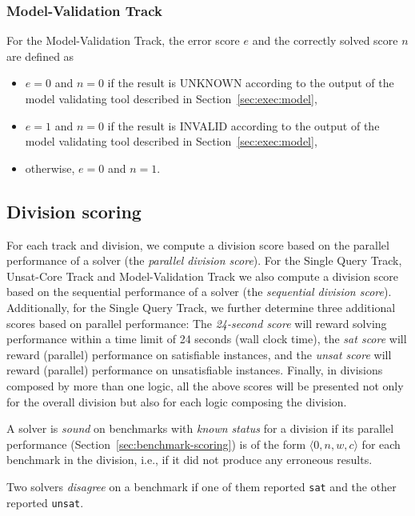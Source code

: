 \documentclass[12pt]{article}
\newcommand{\maintrack}{Single Query Track\xspace}
\newcommand{\ucoretrack}{Unsat-Core Track\xspace}
\newcommand{\mvaltrack}{Model-Validation Track\xspace}
\begin{document}
\subsubsection{\mvaltrack}
  For the \mvaltrack, the error score $e$ and the correctly solved score $n$
  are defined as
  \begin{itemize}
  \item $e=0$ and $n=0$ if the result is UNKNOWN according to the output of
    the model validating tool described in Section~\ref{sec:exec:model},
  \item $e=1$ and $n=0$ if the result is INVALID according to the output of
    the model validating tool described in Section~\ref{sec:exec:model},
  \item otherwise, $e=0$ and $n=1$.
  \end{itemize}

\subsection{Division scoring}
\label{sec:division-scoring}

For each track and division, we compute a division score based on the parallel
performance of a solver (the \emph{parallel division score}).  For the
\maintrack, \ucoretrack and \mvaltrack we also compute a division
score based on the sequential performance of a solver (the \emph{sequential
division score}).  Additionally, for the \maintrack, we further determine three
additional scores based on parallel performance: The \emph{24-second score}
will reward solving performance within a time limit of 24 seconds (wall clock
time), the \emph{sat score} will reward (parallel) performance on satisfiable
instances, and the \emph{unsat score} will reward (parallel) performance on
unsatisfiable instances.
%
Finally, in divisions composed by more than one logic, all the above scores will
be presented not only for the overall division but also for each logic composing
the division.

A solver is \emph{sound} on benchmarks with \emph{known status} for a division
if its parallel performance (Section~\ref{sec:benchmark-scoring}) is of the
form $\langle 0, n, w, c\rangle$ for each benchmark in the division, i.e., if
it did not produce any erroneous results.

Two solvers \emph{disagree} on a benchmark if one of them reported \texttt{sat}
and the other reported \texttt{unsat}.
\end{document}
